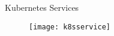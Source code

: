 \begin{frame}{Kubernetes Services}
  \begin{figure}
    \centering
    \texttt{[image: k8sservice]}
  \end{figure}
\end{frame}